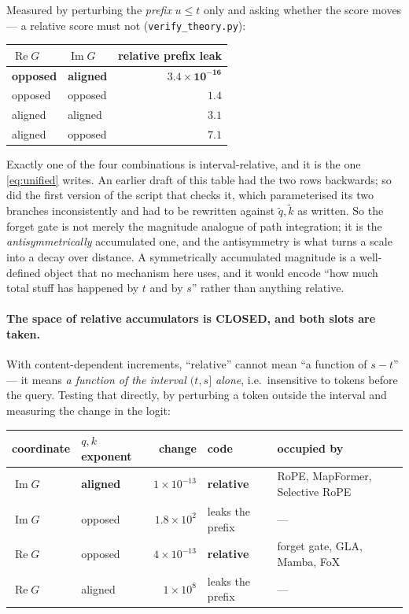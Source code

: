 \documentclass[11pt]{article}
\begin{document}
\noindent\sloppy Measured by perturbing the \emph{prefix} $u\le t$ only and
asking whether the score moves --- a relative score must not
(\texttt{verify\_theory.py}):

\begin{center}\small
\begin{tabular}{llr}
\toprule
$\operatorname{Re}G$ & $\operatorname{Im}G$ & relative prefix leak \\
\midrule
\textbf{opposed} & \textbf{aligned} & $\mathbf{3.4\times10^{-16}}$ \\
opposed & opposed & $1.4$ \\
aligned & aligned & $3.1$ \\
aligned & opposed & $7.1$ \\
\bottomrule
\end{tabular}
\end{center}

\noindent Exactly one of the four combinations is interval-relative, and it is the
one \eqref{eq:unified} writes. An earlier draft of this table had the two rows
backwards; so did the first version of the script that checks it, which
parameterised its two branches inconsistently and had to be rewritten against
$\tilde q,\tilde k$ as written.
So the forget gate is not merely the magnitude analogue of path integration; it is
the \emph{antisymmetrically} accumulated one, and the antisymmetry is what turns a
scale into a decay over distance. A symmetrically accumulated magnitude is a
well-defined object that no mechanism here uses, and it would encode ``how much
total stuff has happened by $t$ and by $s$'' rather than anything relative.

\paragraph{The space of relative accumulators is CLOSED, and both slots are
taken.} With content-dependent increments, ``relative'' cannot mean ``a function
of $s-t$'' --- it means \emph{a function of the interval $(t,s]$ alone}, i.e.\
insensitive to tokens before the query. Testing that directly, by perturbing a
token outside the interval and measuring the change in the logit:

\begin{center}\small
\begin{tabular}{llrll}
\toprule
coordinate & $q,k$ exponent & change & code & occupied by \\
\midrule
$\operatorname{Im}G$ & \textbf{aligned} & $1\!\times\!10^{-13}$ & \textbf{relative} & RoPE, MapFormer, Selective RoPE \\
$\operatorname{Im}G$ & opposed & $1.8\!\times\!10^{2}$  & leaks the prefix & --- \\
$\operatorname{Re}G$ & opposed & $4\!\times\!10^{-13}$ & \textbf{relative} & forget gate, GLA, Mamba, FoX \\
$\operatorname{Re}G$ & aligned & $1\!\times\!10^{8}$   & leaks the prefix & --- \\
\bottomrule
\end{tabular}
\end{center}
\end{document}
